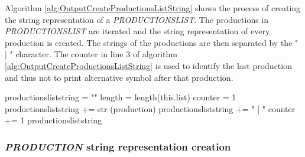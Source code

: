 Algorithm \ref{alg:OutputCreateProductionsListString} shows the process of creating the string representation of a \textit{PRODUCTIONS\textunderscore LIST}. The productions in \textit{PRODUCTIONS\textunderscore LIST} are iterated and the string representation of every production is created. The strings of the productions are then separated by the " | " character. The counter in line 3 of algorithm \ref{alg:OutputCreateProductionsListString} is used to identify the last production and thus not to print alternative symbol after that production.

\begin{algorithm}[H]
\caption{\textit{PRODUCTIONS\textunderscore LIST} string creation}\label{alg:OutputCreateProductionsListString}
\begin{algorithmic}[1]
\State productions\textunderscore list\textunderscore string = ""
\State length = length(this.list)
\State counter = 1
	\State productions\textunderscore list\textunderscore string += str (production)
		\State productions\textunderscore list\textunderscore string += " | "
	\EndIf
	\State counter += 1
\EndFor
\Return productions\textunderscore list\textunderscore string
\end{algorithmic}
\end{algorithm}

\subsubsection{\textit{PRODUCTION} string representation creation}

